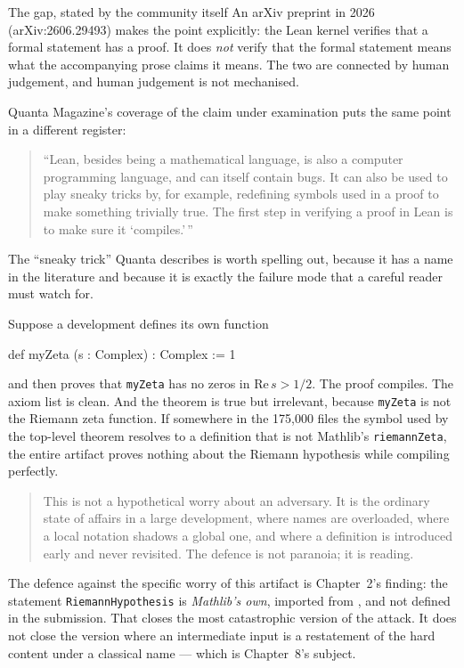 \begin{seamnote}{The gap, stated by the community itself}
An arXiv preprint in 2026 (arXiv:2606.29493) makes the point explicitly:
the Lean kernel verifies that a formal statement has a proof. It does
\emph{not} verify that the formal statement means what the accompanying prose
claims it means. The two are connected by human judgement, and human judgement
is not mechanised.

Quanta Magazine's coverage of the claim under examination puts the same point
in a different register:

\begin{quote}
\small
``Lean, besides being a mathematical language, is also a computer programming
language, and can itself contain bugs. It can also be used to play sneaky tricks
by, for example, redefining symbols used in a proof to make something
trivially true. The first step in verifying a proof in Lean is to make sure it
`compiles.'\,''
\end{quote}
\end{seamnote}

The ``sneaky trick'' Quanta describes is worth spelling out, because it has a
name in the literature and because it is exactly the failure mode that a
careful reader must watch for.

Suppose a development defines its own function
\begin{leanquote}
def myZeta (s : Complex) : Complex := 1
\end{leanquote}
and then proves that \texttt{myZeta} has no zeros in $\mathrm{Re}\,  s > 1/2$. The proof
compiles. The axiom list is clean. And the theorem is true but irrelevant,
because \texttt{myZeta} is not the Riemann zeta function. If somewhere in the
175{,}000 files the symbol used by the top-level theorem resolves to a
definition that is not Mathlib's \texttt{riemannZeta}, the entire artifact
proves nothing about the Riemann hypothesis while compiling perfectly.

\begin{quote}
This is not a hypothetical worry about an adversary. It is the ordinary state
of affairs in a large development, where names are overloaded, where a local
notation shadows a global one, and where a definition is introduced early and
never revisited. The defence is not paranoia; it is reading.
\end{quote}

The defence against the specific worry of this artifact is Chapter~2's
finding: the statement \texttt{RiemannHypothesis} is \emph{Mathlib's own},
imported from , and not
defined in the submission. That closes the most catastrophic version of the
attack. It does not close the version where an intermediate input is a
restatement of the hard content under a classical name --- which is
Chapter~8's subject.


